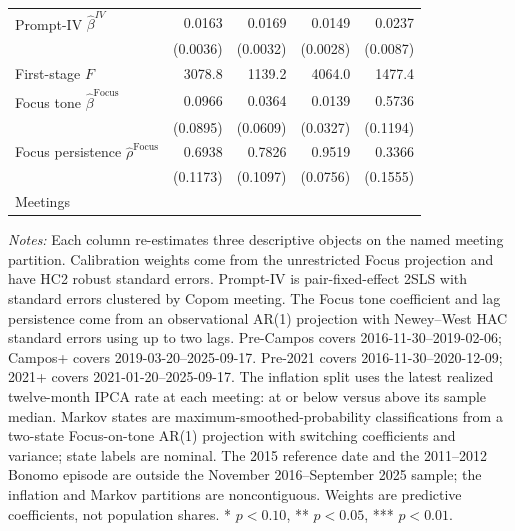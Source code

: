 \begin{table}[htbp]
\begin{threeparttable}
\begin{scriptsize}
\begin{tabular}{ldddd}
\addlinespace
Prompt-IV $\widehat\beta^{IV}$ & 0.0163\sym{***} & 0.0169\sym{***} & 0.0149\sym{***} & 0.0237\sym{**} \\
 & (0.0036) & (0.0032) & (0.0028) & (0.0087) \\
First-stage $F$ & 3078.8 & 1139.2 & 4064.0 & 1477.4 \\
\addlinespace
Focus tone $\widehat\beta^{\mathrm{Focus}}$ & 0.0966 & 0.0364 & 0.0139 & 0.5736\sym{***} \\
 & (0.0895) & (0.0609) & (0.0327) & (0.1194) \\
Focus persistence $\widehat\rho^{\mathrm{Focus}}$ & 0.6938\sym{***} & 0.7826\sym{***} & 0.9519\sym{***} & 0.3366\sym{**} \\
 & (0.1173) & (0.1097) & (0.0756) & (0.1555) \\
Meetings &  &  &  &  \\
\bottomrule
\end{tabular}
\begin{tablenotes}[flushleft]
\scriptsize
\item \textit{Notes:} Each column re-estimates three descriptive objects on the named meeting partition. Calibration weights come from the unrestricted Focus projection and have HC2 robust standard errors. Prompt-IV is pair-fixed-effect 2SLS with standard errors clustered by Copom meeting. The Focus tone coefficient and lag persistence come from an observational AR(1) projection with Newey--West HAC standard errors using up to two lags. Pre-Campos covers 2016-11-30--2019-02-06; Campos+ covers 2019-03-20--2025-09-17. Pre-2021 covers 2016-11-30--2020-12-09; 2021+ covers 2021-01-20--2025-09-17. The inflation split uses the latest realized twelve-month IPCA rate at each meeting: at or below versus above its sample median. Markov states are maximum-smoothed-probability classifications from a two-state Focus-on-tone AR(1) projection with switching coefficients and variance; state labels are nominal. The 2015 reference date and the 2011--2012 Bonomo episode are outside the November 2016--September 2025 sample; the inflation and Markov partitions are noncontiguous. Weights are predictive coefficients, not population shares. * $p<0.10$, ** $p<0.05$, *** $p<0.01$.
\end{tablenotes}
\end{scriptsize}
\end{threeparttable}
\end{table}
